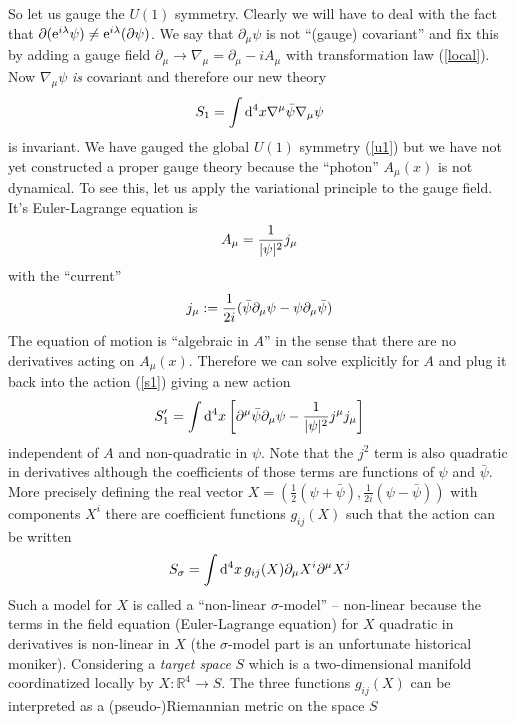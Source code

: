 \documentclass[12pt]{article}
\begin{document}
So let us gauge the $U(1)$ symmetry. Clearly we will have to deal with the fact that $\partial({\rm e}^{i\lambda} \psi) \neq {\rm e}^{i\lambda}(\partial \psi)$. We say that $\partial_\mu \psi$ is not ``(gauge) covariant'' and fix this by adding a gauge field $\partial_\mu\to \nabla_\mu =\partial_\mu -iA_\mu$ with transformation law (\ref{local}). Now $\nabla_\mu \psi$ {\em is} covariant and therefore our new theory
\begin{eqnarray}
\label{s1}
S_1=\int {\rm d}^4x \nabla^\mu \bar \psi \nabla_\mu \psi
\end{eqnarray}
is invariant. We have gauged the global $U(1)$ symmetry (\ref{u1}) but we have not yet constructed a proper gauge theory because the ``photon'' $A_\mu(x)$ is not dynamical. %
To see this, let us apply the variational principle to the gauge field. It's Euler-Lagrange equation is 
\begin{eqnarray}
\label{eom1}
A_\mu={1\over |\psi|^2} j_\mu
\end{eqnarray}
with the ``current''%
\begin{eqnarray}
\label{current}
j_\mu:={1\over 2i} (\bar \psi \partial_\mu \psi- \psi \partial_\mu \bar \psi )
\end{eqnarray}
The equation of motion is ``algebraic in $A$'' in the sense that there are no derivatives acting on $A_\mu(x)$. Therefore we can solve explicitly for $A$ and plug it back into the action (\ref{s1}) giving a new action
\begin{eqnarray}
\label{sigma1}
S^\prime_1= \int {\rm d}^4x \left[ \partial^\mu \bar \psi \partial_\mu \psi-{1\over |\psi|^2} j^\mu j_\mu \right]
\end{eqnarray}
independent of $A$ and non-quadratic in $\psi$. Note that the $j^2$ term is also quadratic in derivatives although the coefficients of those terms are functions of $\psi$ and $\bar \psi$. More precisely defining the real vector $X =\left( \frac12(\psi+\bar \psi), \frac1{2i}(\psi-\bar \psi)\right)$ with components $X^i$ there are coefficient functions $g_{ij}(X)$ such that the action can be written
\begin{eqnarray}
\label{sigma}
S_\sigma= \int {\rm d}^4x \, g_{ij}(X)\partial_\mu X^i \partial^\mu X^j
\end{eqnarray}
Such a model for $X$ is called a ``non-linear $\sigma$-model'' -- non-linear because the terms in the field equation (Euler-Lagrange equation) for $X$ quadratic in derivatives is non-linear in $X$ (the $\sigma$-model part is an unfortunate historical moniker). Considering a {\em target space} $S$ which is a two-dimensional manifold coordinatized locally by $X: {\mathbb R}^4\to S$. The three functions $g_{ij}(X)$ can be interpreted as a (pseudo-)Riemannian metric on the space $S$
\end{document}
